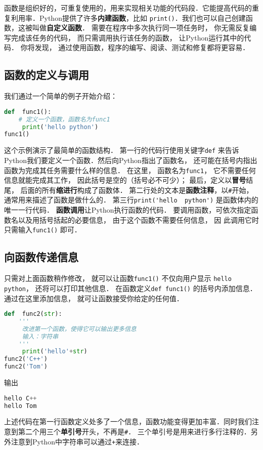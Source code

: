 

函数是组织好的，可重复使用的，用来实现相关功能的代码段．它能提高代码的重复利用率．Python提供了许多\textbf{内建函数}，比如 \verb|print()|．我们也可以自己创建函数，这被叫做\textbf{自定义函数}． 需要在程序中多次执行同一项任务时， 你无需反复编写完成该任务的代码， 而只需调用执行该任务的函数， 让Python运行其中的代码． 你将发现， 通过使用函数，程序的编写、阅读、测试和修复都将更容易．

\subsection{函数的定义与调用}
我们通过一个简单的例子开始介绍：
\begin{lstlisting}[language=python]
def  func1():
    # 定义一个函数，函数名为func1
     print('hello python')
func1()
\end{lstlisting}
这个示例演示了最简单的函数结构． 第一行的代码行使用关键字\verb|def| 来告诉Python我们要定义一个函数．然后向Python指出了函数名， 还可能在括号内指出函数为完成其任务需要什么样的信息． 在这里， 函数名为\verb|func1|， 它不需要任何信息就能完成其工作， 因此括号是空的（括号必不可少）； 最后，定义以\textbf{冒号}结尾， 后面的所有\textbf{缩进行}构成了函数体． 第二行处的文本是\textbf{函数注释}，以\verb|#|开始，通常用来描述了函数是做什么的．
第三行\verb|print('hello  python')| 是函数体内的唯一一行代码．
\textbf{函数调用}让Python执行函数的代码． 要调用函数，可依次指定函数名以及用括号括起的必要信息， 由于这个函数不需要任何信息， 因
此调用它时只需输入\verb|func1()| 即可．

\subsection{向函数传递信息}
只需对上面函数稍作修改， 就可以让函数\verb|func1()| 不仅向用户显示 \verb|hello python|， 还将可以打印其他信息． 在函数定义\verb|def func1()| 的括号内添加信息． 通过在这里添加信息， 就可让函数接受你给定的任何值．
\begin{lstlisting}[language=python]
def  func2(str):
    '''
     改进第一个函数，使得它可以输出更多信息
     输入：字符串
    '''
     print('hello'+str)
func2('C++')
func2('Tom')
\end{lstlisting}
输出
\begin{lstlisting}[language=python]
hello C++
hello Tom
\end{lstlisting}
上述代码在第一行函数定义处多了一个信息，函数功能变得更加丰富．同时我们注意到第二个用三个\textbf{单引号}开头，不再是\verb|#|． 三个单引号是用来进行多行注释的．另外注意到Python中字符串可以通过\verb|+|来连接．

